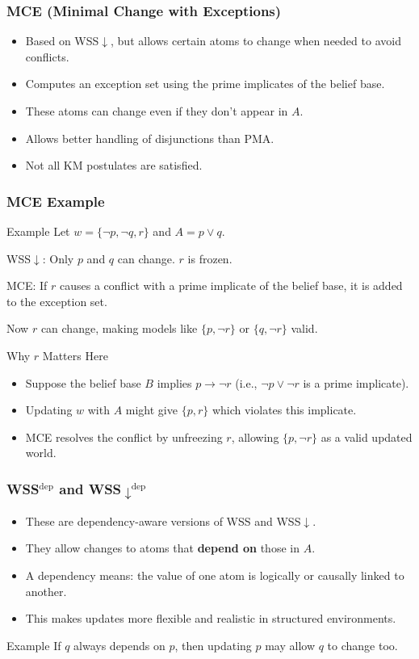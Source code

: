 \documentclass{beamer}
\begin{document}
\begin{frame}
\frametitle{MCE (Minimal Change with Exceptions)}
\begin{itemize}
    \item Based on WSS$\downarrow$, but allows certain atoms to change when needed to avoid conflicts.
    \item Computes an exception set using the prime implicates of the belief base.
    \item These atoms can change even if they don’t appear in $A$.
    \item Allows better handling of disjunctions than PMA.
    \item Not all KM postulates are satisfied.
\end{itemize}
\end{frame}

\begin{frame}
\frametitle{MCE Example}
\begin{block}{Example}
Let $w = \{\neg p, \neg q, r\}$ and $A = p \lor q$.

WSS$\downarrow$:
Only $p$ and $q$ can change. $r$ is frozen.

MCE:
If $r$ causes a conflict with a prime implicate of the belief base, it is added to the exception set.

Now $r$ can change, making models like $\{p, \neg r\}$ or $\{q, \neg r\}$ valid.
\end{block}

\begin{block}{Why $r$ Matters Here}
\begin{itemize}
    \item Suppose the belief base $B$ implies $p \rightarrow \neg r$ (i.e., $\neg p \lor \neg r$ is a prime implicate).
    \item Updating $w$ with $A$ might give $\{p, r\}$ which violates this implicate.
    \item MCE resolves the conflict by unfreezing $r$, allowing $\{p, \neg r\}$ as a valid updated world.
\end{itemize}
\end{block}
\end{frame}

\begin{frame}
\frametitle{WSS$^{\text{dep}}$ and WSS$\downarrow^{\text{dep}}$}
\begin{itemize}
    \item These are dependency-aware versions of WSS and WSS$\downarrow$.
    \item They allow changes to atoms that \textbf{depend on} those in $A$.
    \item A dependency means: the value of one atom is logically or causally linked to another.
    \item This makes updates more flexible and realistic in structured environments.
\end{itemize}
\pause
\begin{block}{Example}
If $q$ always depends on $p$, then updating $p$ may allow $q$ to change too.
\end{block}
\end{frame}
\end{document}

